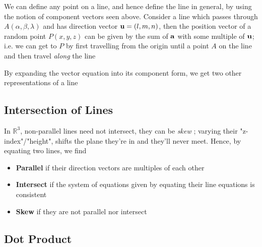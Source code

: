 \documentclass[english,course]{Notes}
\newcommand{\real}{\mathbb{R}}
\newcommand{\ita}[1]{\textit{#1}}
\begin{document}

\par{We can define any point on a line, and hence define the line in general, by using the notion of component vectors seen above. Consider a line which passes through $A(\alpha, \beta, \lambda)$ and has direction vector $\mathbf{u} = (l,m,n)$, then the position vector of a random point $P(x,y,z)$ can be given by the sum of $\mathbf{a}$ with some multiple of $\mathbf{u}$; i.e. we can get to $P$ by first travelling from the origin until a point $A$ on the line and then travel \ita{along} the line}


\par{By expanding the vector equation into its component form, we get two other representations of a line}




\subsection{Intersection of Lines}

\par{In $\real^3$, non-parallel lines need not intersect, they can be \ita{skew} ; varying their "z-index"/"height", shifts the plane they're in and they'll never meet. Hence, by equating two lines, we find}

\begin{itemize}
\item[] \textbf{Parallel} if their direction vectors are multiples of each other
\item[] \textbf{Intersect} if the system of equations given by equating their line equations is consistent
\item[] \textbf{Skew} if they are not parallel nor intersect
\end{itemize}

\subsection{Dot Product}
\end{document}

